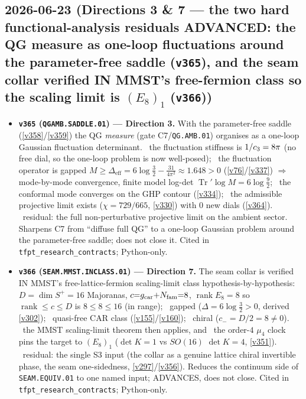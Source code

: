 \subsection*{2026-06-23 (Directions 3 \& 7 --- the two hard functional-analysis residuals ADVANCED: the QG measure as one-loop fluctuations around the parameter-free saddle (\texttt{v365}), and the seam collar verified IN MMST's free-fermion class so the scaling limit is $(E_8)_1$ (\texttt{v366}))}
\begin{itemize}
\item \textbf{\texttt{v365} (\texttt{QGAMB.SADDLE.01}) --- Direction 3.} With the parameter-free saddle
(\vref{v358}/\vref{v359}) the QG \emph{measure} (gate C7/\texttt{QG.AMB.01}) organises as a one-loop Gaussian
fluctuation determinant. \mE\ the fluctuation stiffness is $1/c_3=8\pi$ (no free dial, so the one-loop
problem is now well-posed); \mE\ the fluctuation operator is gapped
$M\ge\Delta_{\mathrm{eff}}=6\log\tfrac32-\tfrac{31}{4\pi^2}\approx1.648>0$ (\vref{v76}/\vref{v337}) $\Rightarrow$
mode-by-mode convergence, finite model log-det $\operatorname{Tr}'\log M=6\log\tfrac92$; \mC\ the conformal mode
converges on the GHP contour (\vref{v334}); \mE\ the admissible projective limit exists ($\chi=729/665$,
\vref{v330}) with $0$ new dials (\vref{v364}). \mO\ residual: the full non-perturbative projective limit on the
ambient sector. Sharpens C7 from ``diffuse full QG'' to a one-loop Gaussian problem around the parameter-free
saddle; does not close it. Cited in \texttt{tfpt\_research\_contracts}; Python-only.
\item \textbf{\texttt{v366} (\texttt{SEAM.MMST.INCLASS.01}) --- Direction 7.} The seam collar is verified IN
MMST's free-lattice-fermion scaling-limit class hypothesis-by-hypothesis: \mE\ $D{=}\dim S^+{=}16$ Majoranas,
$c{=}g_{\mathrm{car}}{+}N_{\mathrm{fam}}{=}8$, $\operatorname{rank}E_8{=}8$ so $\operatorname{rank}\le c\le D$ is $8\le8\le16$ (in
range); \mE\ gapped ($\Delta{=}6\log\tfrac32{>}0$, derived \vref{v302}); \mC\ quasi-free CAR class
(\vref{v155}/\vref{v160}); \mE\ chiral ($c_-{=}D/2{=}8\neq0$). \mC\ the MMST scaling-limit theorem then applies,
and \mE\ the order-$4$ $\mu_4$ clock pins the target to $(E_8)_1$ ($\det K{=}1$ vs $SO(16)$ $\det K{=}4$,
\vref{v351}). \mO\ residual: the single S3 input (the collar as a genuine lattice chiral invertible phase, the
seam one-sidedness, \vref{v297}/\vref{v356}). Reduces the continuum side of \texttt{SEAM.EQUIV.01} to one named
input; ADVANCES, does not close. Cited in \texttt{tfpt\_research\_contracts}; Python-only.
\end{itemize}

